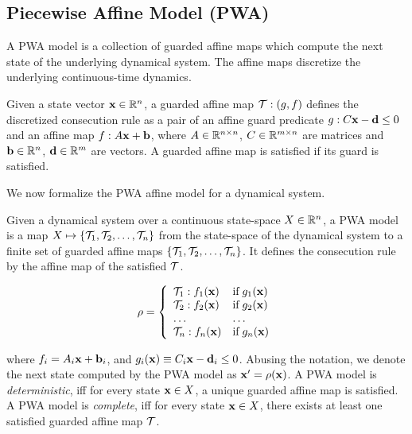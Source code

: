 \subsection{Piecewise Affine Model (PWA)}

A PWA model is a collection of guarded affine maps which compute the
next state of the underlying dynamical system. The affine maps
discretize the underlying continuous-time dynamics.

Given a state vector $\mathbf{x}\in\mathbb{R}^n$, a guarded affine map
$\mathcal{T}:(g, f)$ defines the discretized consecution rule as a
pair of an affine guard predicate $g:C\mathbf{x} - \mathbf{d} \le 0$ and an affine map
$f:A\mathbf{x}+\mathbf{b}$, where $A \in \mathbb{R}^{n \times n}$, $C \in
\mathbb{R}^{m \times n}$ are matrices and $\mathbf{b} \in \mathbb{R}^n$, $\mathbf{d}
\in \mathbb{R}^m$ are vectors. A guarded affine map is satisfied if its
guard is satisfied.

We now formalize the PWA affine model for a dynamical system.
\begin{definition}

Given a dynamical system over a continuous state-space
$X\in\mathbb{R}^n$, a PWA model is a map $X \mapsto
\{\mathcal{T}_1, \mathcal{T}_2, \ldots, \mathcal{T}_n\}$ from the state-space of the
dynamical system to a finite set of guarded affine maps
$\{\mathcal{T}_1, \mathcal{T}_2, \ldots, \mathcal{T}_n\}$. It defines the consecution
rule by the affine map of the satisfied $\mathcal{T}$.

\begin{equation}
    \rho = \left\{
        \begin{array}{ll}
            \mathcal{T}_1: f_1(\mathbf{x}) &\text{if}\; g_1(\mathbf{x}) \\
            \mathcal{T}_2: f_2(\mathbf{x}) &\text{if}\; g_2(\mathbf{x}) \\
            \ldots & \ldots\\
            \mathcal{T}_n: f_n(\mathbf{x}) &\text{if}\; g_n(\mathbf{x}) \\
        \end{array}
    \right.
\end{equation}

\end{definition}

where $f_i = A_i\mathbf{x} + \mathbf{b}_i$, and $g_i(\mathbf{x}) \equiv C_i\mathbf{x}-\mathbf{d}_i\le0$.
Abusing the notation, we denote the next state computed by the PWA
model as $\mathbf{x}' = \rho(\mathbf{x})$. A PWA model is \textit{deterministic}, iff
for every state $\mathbf{x}\in X$, a unique guarded affine map is
satisfied. A PWA model is \textit{complete}, iff for every state
$\mathbf{x}\in X$, there exists at least one satisfied guarded affine
map $\mathcal{T}$.
